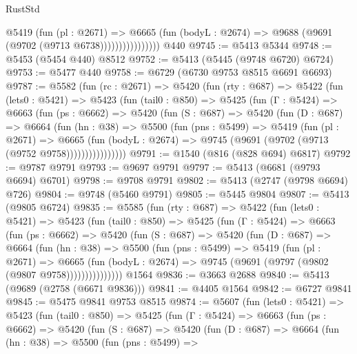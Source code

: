 \begin{lexlean}{RustStd}
\begin{coremodule}
                        @5419
                          (fun (pl : @2671) =>
                          @6665
                            (fun (bodyL : @2674) => @9688 (@9691 (@9702 (@9713 @6738))))))))))))))))
    @440
@9745 := @5413 @5344
@9748 := @5453 (@5454 @440) @8512
@9752 := @5413 (@5445 (@9748 @6720) @6724)
@9753 := @5477 @440
@9758 := @6729 (@6730 @9753 @8515 @6691 @6693)
@9787 := @5582
    (fun (rc : @2671) =>
    @5420
      (fun (rty : @687) =>
      @5422
        (fun (lets0 : @5421) =>
        @5423
          (fun (tail0 : @850) =>
          @5425
            (fun (Γ : @5424) =>
            @6663
              (fun (ps : @6662) =>
              @5420
                (fun (S : @687) =>
                @5420
                  (fun (D : @687) =>
                  @6664
                    (fun (hn : @38) =>
                    @5500
                      (fun (pns : @5499) =>
                      @5419
                        (fun (pl : @2671) =>
                        @6665
                          (fun (bodyL : @2674) =>
                          @9745 (@9691 (@9702 (@9713 (@9752 @9758))))))))))))))))
@9791 := @1540 (@816 (@828 @694) @6817)
@9792 := @9787 @9791
@9793 := @9697 @9791
@9797 := @5413 (@6681 (@9793 @6694) @6701)
@9798 := @9708 @9791
@9802 := @5413 (@2747 (@9798 @6694) @726)
@9804 := @9748 (@5460 @9791)
@9805 := @5445 @9804
@9807 := @5413 (@9805 @6724)
@9835 := @5585
    (fun (rty : @687) =>
    @5422
      (fun (lets0 : @5421) =>
      @5423
        (fun (tail0 : @850) =>
        @5425
          (fun (Γ : @5424) =>
          @6663
            (fun (ps : @6662) =>
            @5420
              (fun (S : @687) =>
              @5420
                (fun (D : @687) =>
                @6664
                  (fun (hn : @38) =>
                  @5500
                    (fun (pns : @5499) =>
                    @5419
                      (fun (pl : @2671) =>
                      @6665
                        (fun (bodyL : @2674) =>
                        @9745 (@9691 (@9797 (@9802 (@9807 @9758)))))))))))))))
    @1564
@9836 := @3663 @2688
@9840 := @5413 (@9689 (@2758 (@6671 @9836)))
@9841 := @4405 @1564
@9842 := @6727 @9841
@9845 := @5475 @9841 @9753 @8515
@9874 := @5607
    (fun (lets0 : @5421) =>
    @5423
      (fun (tail0 : @850) =>
      @5425
        (fun (Γ : @5424) =>
        @6663
          (fun (ps : @6662) =>
          @5420
            (fun (S : @687) =>
            @5420
              (fun (D : @687) =>
              @6664
                (fun (hn : @38) =>
                @5500
                  (fun (pns : @5499) =>

\end{coremodule}
\end{lexlean}
